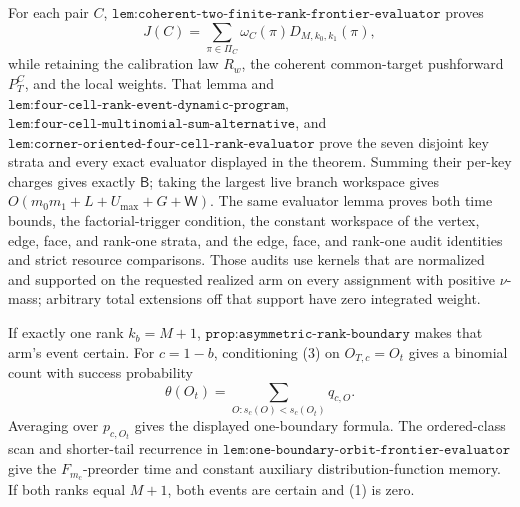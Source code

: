 For each pair \(C\), \(\texttt{lem:coherent-two-finite-rank-frontier-evaluator}\) proves
\[
J(C)=\sum_{\pi\in\Pi_C}\omega_C(\pi)D_{M,k_0,k_1}(\pi),
\tag{4}
\]
while retaining the calibration law \(R_w\), the coherent common-target pushforward \(P_T^C\), and the local weights. That lemma and \(\texttt{lem:four-cell-rank-event-dynamic-program}\), \(\texttt{lem:four-cell-multinomial-sum-alternative}\), and \(\texttt{lem:corner-oriented-four-cell-rank-evaluator}\) prove the seven disjoint key strata and every exact evaluator displayed in the theorem. Summing their per-key charges gives exactly \(\mathsf B\); taking the largest live branch workspace gives \(O(m_0m_1+L+U_{\max}+G+\mathsf W)\). The same evaluator lemma proves both time bounds, the factorial-trigger condition, the constant workspace of the vertex, edge, face, and rank-one strata, and the edge, face, and rank-one audit identities and strict resource comparisons. Those audits use kernels that are normalized and supported on the requested realized arm on every assignment with positive \(\nu\)-mass; arbitrary total extensions off that support have zero integrated weight.

If exactly one rank \(k_b=M+1\), \(\texttt{prop:asymmetric-rank-boundary}\) makes that arm's event certain. For \(c=1-b\), conditioning (3) on \(O_{T,c}=O_t\) gives a binomial count with success probability
\[
\theta(O_t)=\sum_{O:s_c(O)<s_c(O_t)}q_{c,O}.
\]
Averaging over \(p_{c,O_t}\) gives the displayed one-boundary formula. The ordered-class scan and shorter-tail recurrence in \(\texttt{lem:one-boundary-orbit-frontier-evaluator}\) give the \(F_{m_c}\)-preorder time and constant auxiliary distribution-function memory. If both ranks equal \(M+1\), both events are certain and (1) is zero.

